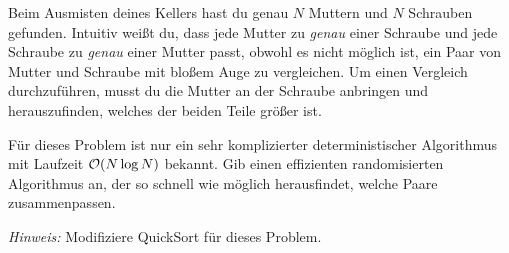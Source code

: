 \documentclass{uebung_cs}
\begin{document}
\begin{exercise}
	Beim Ausmisten deines Kellers hast du genau $N$ Muttern und $N$ Schrauben gefunden.
	Intuitiv weißt du, dass jede Mutter zu \emph{genau} einer Schraube und jede Schraube zu \emph{genau} einer Mutter passt, obwohl es nicht möglich ist, ein Paar von Mutter und Schraube mit bloßem Auge zu vergleichen. 
	Um einen Vergleich durchzuführen, musst du die Mutter an der Schraube anbringen und herauszufinden, welches der beiden Teile größer ist. 

	Für dieses Problem ist nur ein sehr komplizierter deterministischer Algorithmus mit Laufzeit $\mathcal{O}(N \log N)$ bekannt. 
	Gib einen effizienten randomisierten Algorithmus an, der so schnell wie möglich herausfindet, welche Paare zusammenpassen. 
	
	\textit{Hinweis:} Modifiziere QuickSort für dieses Problem.
\end{exercise}
\end{document}

